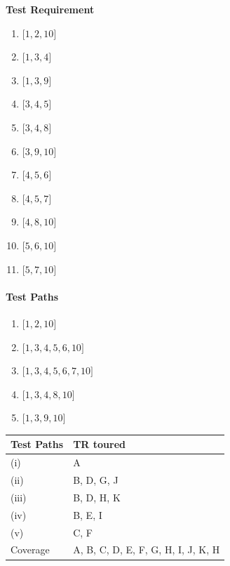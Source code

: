 \documentclass[ngerman]{article}
\begin{document}
\begin{paracol}{2}
 \textbf{Test Requirement}
\begin{enumerate}[label=\Alph*]
\item $\lbrack 1,2,10 \rbrack$
\item $\lbrack 1,3,4\rbrack$
\item $\lbrack 1,3,9\rbrack$
\item $\lbrack 3,4,5\rbrack$
\item $\lbrack 3,4,8\rbrack$
\item $\lbrack 3,9,10\rbrack$
\item $\lbrack 4,5,6\rbrack$
\item $\lbrack 4,5,7\rbrack$
\item $\lbrack 4,8,10\rbrack$
\item $\lbrack 5,6,10\rbrack$
\item $\lbrack 5,7,10\rbrack$
\end{enumerate}

\switchcolumn
\paragraph{Test Paths}
\begin{enumerate}[label=(\roman*)]
\item $\lbrack 1, 2, 10 \rbrack$
\item $\lbrack 1, 3, 4, 5, 6, 10\rbrack$
\item $\lbrack 1, 3, 4, 5, 6, 7, 10\rbrack$
\item $\lbrack 1, 3, 4, 8, 10\rbrack$
\item $\lbrack 1, 3, 9, 10\rbrack$
\end{enumerate}

\begin{table}
\begin{tabular}{|l|p{2.5cm}|}
\hline
\textbf{Test Paths} & \textbf{TR toured} \\ \hline \hline
(i) & A\\ \hline
(ii)  & B, D, G, J \\ \hline
(iii) & B, D, H, K\\ \hline
(iv) & B, E, I\\ \hline
(v) & C, F\\ \hline \hline
Coverage & A, B, C, D, E, F, G, H, I, J, K, H\\ \hline
\end{tabular}
\end{table}

\end{paracol}
\end{document}
